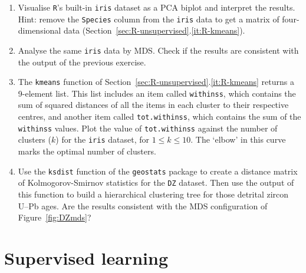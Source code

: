 \begin{enumerate}
  
\item Visualise \texttt{R}'s built-in \texttt{iris} dataset as a PCA
  biplot and interpret the results. Hint: remove the \texttt{Species}
  column from the \texttt{iris} data to get a matrix of
  four-dimensional data
  (Section~\ref{sec:R-unsupervised}.\ref{it:R-kmeans}).
  
\item Analyse the same \texttt{iris} data by MDS. Check if the results
  are consistent with the output of the previous exercise.

\item\label{it:ex-withinss} The \texttt{kmeans} function of
  Section~\ref{sec:R-unsupervised}.\ref{it:R-kmeans} returns a
  9-element list. This list includes an item called \texttt{withinss},
  which contains the sum of squared distances of all the items in each
  cluster to their respective centres, and another item called
  \texttt{tot.withinss}, which contains the sum of the
  \texttt{withinss} values. Plot the value of \texttt{tot.withinss}
  against the number of clusters ($k$) for the \texttt{iris} dataset,
  for $1\leq{k}\leq{10}$. The `elbow' in this curve marks the optimal
  number of clusters.

\item Use the \texttt{ksdist} function of the \texttt{geostats}
  package to create a distance matrix of Kolmogorov-Smirnov statistics
  for the \texttt{DZ} dataset. Then use the output of this function to
  build a hierarchical clustering tree for those detrital zircon U--Pb
  ages.  Are the results consistent with the MDS configuration of
  Figure~\ref{fig:DZmds}?
  
\end{enumerate}
  
\section{Supervised learning}
\label{sec:ex-supervised}

